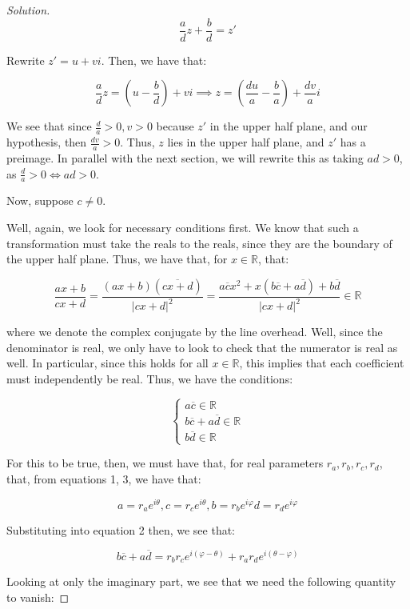 \documentclass[10pt]{article}
\begin{document}
\begin{proof}[Solution]
$$ \frac{a}{d}z + \frac{b}{d} = z' $$

Rewrite $z' = u + vi$. Then, we have that:

$$ \frac{a}{d} z = \left(u - \frac{b}{d}\right) + vi \implies z = \left(\frac{du}{a}  - \frac{b}{a}\right) + \frac{dv}{a} i $$

We see that since $\frac{d}{a} > 0, v > 0$ because $z'$ in the upper half plane, and our hypothesis, then $\frac{dv}{a} > 0$. Thus, $z$ lies in the upper half plane, and $z'$ has a preimage. In parallel with the next section, we will rewrite this as taking $ad > 0$, as $\frac{d}{a} > 0 \iff ad > 0$.

Now, suppose $c \not = 0$.

Well, again, we look for necessary conditions first. We know that such a transformation must take the reals to the reals, since they are the boundary of the upper half plane. Thus, we have that, for $x \in \mathbb{R}$, that:

$$ \frac{ax  + b }{cx + d} = \frac{(ax + b) (\overline{cx + d})}{ |cx + d|^2 } = \frac{a\overline{c} x^2 + x(b\overline{c} + a \overline{d}) + b\overline{d} }{ | cx + d|^2} \in \mathbb{R}$$

where we denote the complex conjugate by the line overhead. Well, since the denominator is real, we only have to look to check that the numerator is real as well. In particular, since this holds for all $x \in \mathbb{R}$, this implies that each coefficient must independently be real. Thus, we have the conditions:

$$ \begin{cases} a\overline{c} \in \mathbb{R} \\ b\overline{c} + a \overline{d} \in \mathbb{R} \\ b \overline{d} \in \mathbb{R} \end{cases} $$

For this to be true, then, we must have that, for real parameters $r_a, r_b, r_c, r_d$, that, from equations 1, 3, we have that:

$$ a = r_a e^{i \theta}, c = r_c e^{i\theta}, b = r_b e^{i \varphi} d = r_d e^{i \varphi} $$

Substituting into equation 2 then, we see that:

$$  b\overline{c} + a \overline{d} = r_b r_c e^{i(\varphi - \theta)} + r_a r_d e^{i(\theta - \varphi)} $$

Looking at only the imaginary part, we see that we need the following quantity to vanish:


\end{proof}
\end{document}
